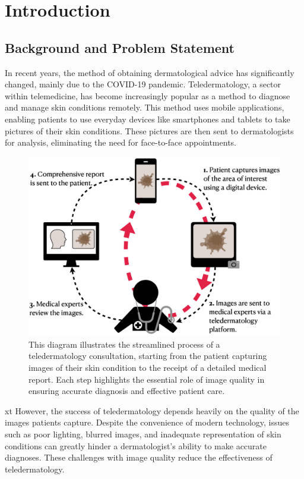 \chapter{Introduction}
\label{ch:Introduction}

\section{Background and Problem Statement}
\label{sec:BackgroundProblemStatement}
In recent years, the method of obtaining dermatological advice has significantly changed, mainly due to the COVID-19 pandemic. Teledermatology, a sector within telemedicine, has become increasingly popular as a method to diagnose and manage skin conditions remotely. This method uses mobile applications, enabling patients to use everyday devices like smartphones and tablets to take pictures of their skin conditions. These pictures are then sent to dermatologists for analysis, eliminating the need for face-to-face appointments. \par
\vspace{\baselineskip}
\begin{figure}[ht]
    \centering
    \includegraphics[keepaspectratio,width=15cm]{img/TD_workflow.png}
    \caption{This diagram illustrates the streamlined process of a teledermatology consultation, starting from the patient capturing images of their skin condition to the receipt of a detailed medical report. Each step highlights the essential role of image quality in ensuring accurate diagnosis and effective patient care.}
    \label{fig:TD_workflow}
\end{figure}xt
However, the success of teledermatology depends heavily on the quality of the images patients capture. Despite the convenience of modern technology, issues such as poor lighting, blurred images, and inadequate representation of skin conditions can greatly hinder a dermatologist's ability to make accurate diagnoses. These challenges with image quality reduce the effectiveness of teledermatology. \par
